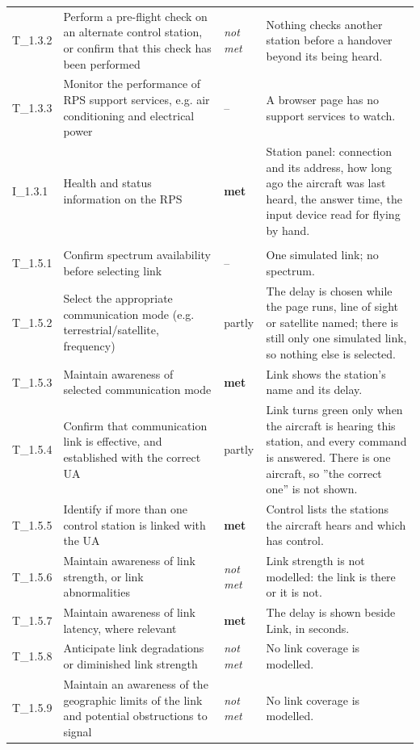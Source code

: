 \begin{longtable}{@{}>{\raggedright\arraybackslash}p{12mm}>{\raggedright\arraybackslash}p{57mm}>{\raggedright\arraybackslash}p{13mm}>{\raggedright\arraybackslash}p{70mm}@{}}
T\_1.3.2 & Perform a pre-flight check on an alternate control station, or confirm that this check has been performed & \emph{not met} & Nothing checks another station before a handover beyond its being heard. \\
T\_1.3.3 & Monitor the performance of RPS support services, e.g. air conditioning and electrical power & -- & A browser page has no support services to watch. \\
I\_1.3.1 & Health and status information on the RPS & \textbf{met} & Station panel: connection and its address, how long ago the aircraft was last heard, the answer time, the input device read for flying by hand. \\
\addlinespace\multicolumn{4}{@{}l}{\textbf{The link}} \\
T\_1.5.1 & Confirm spectrum availability before selecting link & -- & One simulated link; no spectrum. \\
T\_1.5.2 & Select the appropriate communication mode (e.g. terrestrial/satellite, frequency) & partly & The delay is chosen while the page runs, line of sight or satellite named; there is still only one simulated link, so nothing else is selected. \\
T\_1.5.3 & Maintain awareness of selected communication mode & \textbf{met} & Link shows the station's name and its delay. \\
T\_1.5.4 & Confirm that communication link is effective, and established with the correct UA & partly & Link turns green only when the aircraft is hearing this station, and every command is answered. There is one aircraft, so ''the correct one'' is not shown. \\
T\_1.5.5 & Identify if more than one control station is linked with the UA & \textbf{met} & Control lists the stations the aircraft hears and which has control. \\
T\_1.5.6 & Maintain awareness of link strength, or link abnormalities & \emph{not met} & Link strength is not modelled: the link is there or it is not. \\
T\_1.5.7 & Maintain awareness of link latency, where relevant & \textbf{met} & The delay is shown beside Link, in seconds. \\
T\_1.5.8 & Anticipate link degradations or diminished link strength & \emph{not met} & No link coverage is modelled. \\
T\_1.5.9 & Maintain an awareness of the geographic limits of the link and potential obstructions to signal & \emph{not met} & No link coverage is modelled. \\

\end{longtable}
